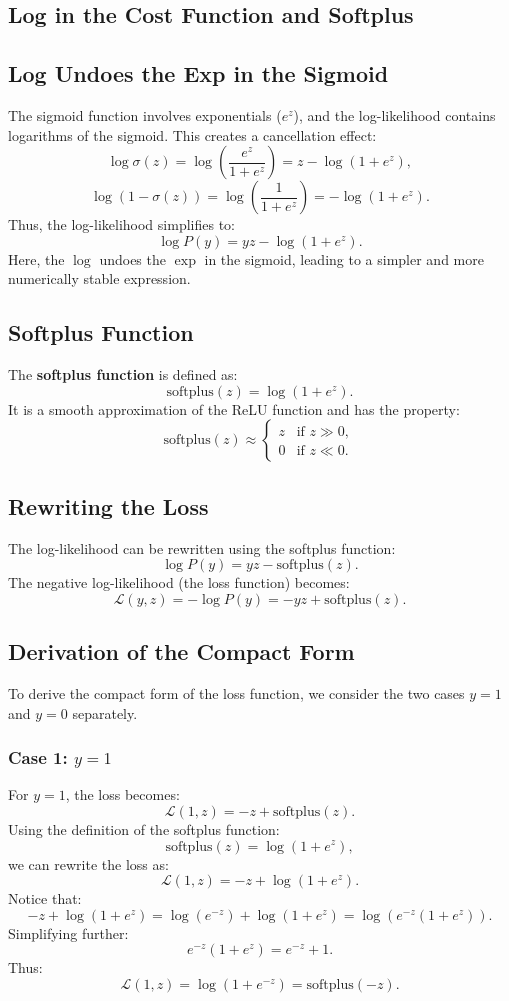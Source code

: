\begin{notechapter}
\section{Log in the Cost Function and Softplus}

\subsection{Log Undoes the Exp in the Sigmoid}
The sigmoid function involves exponentials (\( e^z \)), and the log-likelihood contains logarithms of the sigmoid. This creates a cancellation effect:
\[
\log \sigma(z) = \log \left( \frac{e^z}{1 + e^z} \right) = z - \log(1 + e^z),
\]
\[
\log (1 - \sigma(z)) = \log \left( \frac{1}{1 + e^z} \right) = -\log(1 + e^z).
\]
Thus, the log-likelihood simplifies to:
\[
\log P(y) = yz - \log(1 + e^z).
\]
Here, the \( \log \) undoes the \( \exp \) in the sigmoid, leading to a simpler and more numerically stable expression.

\subsection{Softplus Function}
The \textbf{softplus function} is defined as:
\[
\text{softplus}(z) = \log(1 + e^z).
\]
It is a smooth approximation of the ReLU function and has the property:
\[
\text{softplus}(z) \approx 
\begin{cases}
z & \text{if } z \gg 0, \\
0 & \text{if } z \ll 0.
\end{cases}
\]

\subsection{Rewriting the Loss}
The log-likelihood can be rewritten using the softplus function:
\[
\log P(y) = yz - \text{softplus}(z).
\]
The negative log-likelihood (the loss function) becomes:
\[
\mathcal{L}(y, z) = -\log P(y) = -yz + \text{softplus}(z).
\]

\subsection{Derivation of the Compact Form}
To derive the compact form of the loss function, we consider the two cases \( y = 1 \) and \( y = 0 \) separately.

\subsubsection{Case 1: \( y = 1 \)}
For \( y = 1 \), the loss becomes:
\[
\mathcal{L}(1, z) = -z + \text{softplus}(z).
\]
Using the definition of the softplus function:
\[
\text{softplus}(z) = \log(1 + e^z),
\]
we can rewrite the loss as:
\[
\mathcal{L}(1, z) = -z + \log(1 + e^z).
\]
Notice that:
\[
-z + \log(1 + e^z) = \log(e^{-z}) + \log(1 + e^z) = \log(e^{-z} (1 + e^z)).
\]
Simplifying further:
\[
e^{-z} (1 + e^z) = e^{-z} + 1.
\]
Thus:
\[
\mathcal{L}(1, z) = \log(1 + e^{-z}) = \text{softplus}(-z).
\]


\end{notechapter}
